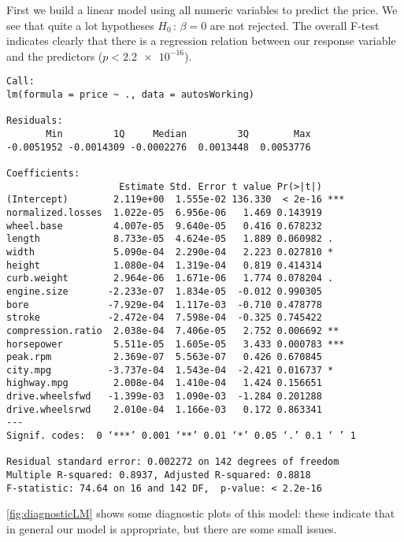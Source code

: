 First we build a linear model using all numeric variables to predict the price. We see that quite a lot hypotheses $H_0\,:\,\beta = 0$ are not rejected. The overall F-test indicates clearly that there is a regression relation between our response variable and the predictors ($p < \num{2.2e-16}$).
\begin{verbatim}
Call:
lm(formula = price ~ ., data = autosWorking)

Residuals:
       Min         1Q     Median         3Q        Max 
-0.0051952 -0.0014309 -0.0002276  0.0013448  0.0053776 

Coefficients:
                    Estimate Std. Error t value Pr(>|t|)    
(Intercept)        2.119e+00  1.555e-02 136.330  < 2e-16 ***
normalized.losses  1.022e-05  6.956e-06   1.469 0.143919    
wheel.base         4.007e-05  9.640e-05   0.416 0.678232    
length             8.733e-05  4.624e-05   1.889 0.060982 .  
width              5.090e-04  2.290e-04   2.223 0.027810 *  
height             1.080e-04  1.319e-04   0.819 0.414314    
curb.weight        2.964e-06  1.671e-06   1.774 0.078204 .  
engine.size       -2.233e-07  1.834e-05  -0.012 0.990305    
bore              -7.929e-04  1.117e-03  -0.710 0.478778    
stroke            -2.472e-04  7.598e-04  -0.325 0.745422    
compression.ratio  2.038e-04  7.406e-05   2.752 0.006692 ** 
horsepower         5.511e-05  1.605e-05   3.433 0.000783 ***
peak.rpm           2.369e-07  5.563e-07   0.426 0.670845    
city.mpg          -3.737e-04  1.543e-04  -2.421 0.016737 *  
highway.mpg        2.008e-04  1.410e-04   1.424 0.156651    
drive.wheelsfwd   -1.399e-03  1.090e-03  -1.284 0.201288    
drive.wheelsrwd    2.010e-04  1.166e-03   0.172 0.863341    
---
Signif. codes:  0 ‘***’ 0.001 ‘**’ 0.01 ‘*’ 0.05 ‘.’ 0.1 ‘ ’ 1 

Residual standard error: 0.002272 on 142 degrees of freedom
Multiple R-squared: 0.8937,	Adjusted R-squared: 0.8818 
F-statistic: 74.64 on 16 and 142 DF,  p-value: < 2.2e-16 
\end{verbatim}
\autoref{fig:diagnosticLM} shows some diagnostic plots of this model: these indicate that in general our model is appropriate, but there are some small issues.

